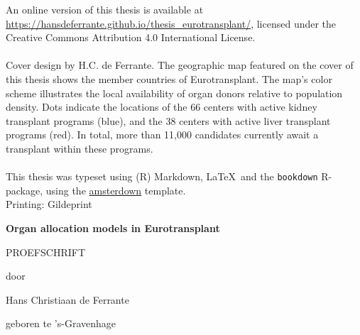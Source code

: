 \documentclass[11pt,twoside,]{book}
\begin{document}
An online version of this thesis is available at \url{https://hansdeferrante.github.io/thesis_eurotransplant/}, licensed under the Creative Commons Attribution 4.0 International License.
\\
\\
Cover design by H.C. de Ferrante. The geographic map featured on the cover of 
this thesis shows the member countries of Eurotransplant. The map's color 
scheme illustrates the local availability of organ donors relative to population
density. Dots indicate the locations of the 66 centers with active kidney transplant
programs (blue), and the 38 centers with active liver transplant programs (red). 
In total, more than 11,000 candidates currently await a transplant within these
programs.
\\
\\
This thesis was typeset using (R) Markdown, \LaTeX\ and the \verb+bookdown+ R-package, using the \href{https://lcreteig.github.io/amsterdown/}{amsterdown} template.\\

Printing: Gildeprint



\endgroup

\clearpage
\thispagestyle{empty}
\vspace*{\drop}
\begin{center}
\Huge\textbf{Organ allocation models in Eurotransplant}\par
\vfill %
\large \textsc{PROEFSCHRIFT}\par
\vspace{\baselineskip}
\par %
\vspace{\baselineskip}
{\large door}\par
\vspace{\baselineskip}
{\Large Hans Christiaan de Ferrante}\par
\vspace{\baselineskip}
{\large geboren te 's-Gravenhage}
\end{center}
\end{document}
